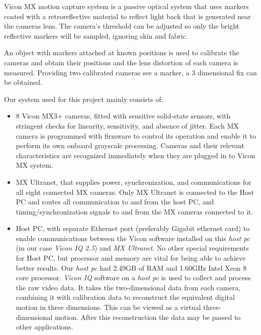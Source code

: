 

Vicon MX motion capture system is a passive optical system that uses markers
coated with a retroreflective material to reflect light back that is generated near the cameras lens.
The camera's threshold can be adjusted so only the bright reflective markers will be sampled, ignoring skin and fabric.

An object with markers attached at known positions is used to calibrate the cameras and obtain their positions and the lens distortion of each camera is measured. Providing two calibrated cameras see a marker, a 3 dimensional fix can be obtained.

Our system used for this project mainly consists of:

\begin{itemize}
\item 8 Vicon MX3+ cameras, fitted with sensitive solid-state
sensors, with stringent checks for linearity, sensitivity, and absence of jitter.
Each MX camera is programmed with firmware to control its operation
and enable it to perform its own onboard grayscale processing.
Cameras and their relevant characteristics are recognized immediately when they are plugged in to Vicon MX system.

\item MX Ultranet, that supplies power, synchronization, and
communications for all eight connected MX cameras. Only MX Ultranet is connected to the Host PC
and routes all communication to and from the host PC, and timing/synchronization signals to and from the
MX cameras connected to it.

\item Host PC, with separate Ethernet port (preferably Gigabit ethernet card) to enable communications between
the Vicon software installed on this \emph{host pc} (in our case \emph{Vicon IQ 2.5}) and \emph{MX Ultranet}.
No other special requirements for Host PC, but processor and memory are vital for being able to achieve better results. Our \emph{host pc} had 2.49GB of RAM and 1.60GHz Intel Xeon 8 core processor.
\emph{Vicon IQ} software on a \emph{host pc} is used to collect
and process the raw video data. It takes the two-dimensional data from each
camera, combining it with calibration data to reconstruct the equivalent digital
motion in three dimensions. This can be viewed as a virtual
three-dimensional motion. After this reconstruction the data may be passed to
other applications.
\end{itemize}

